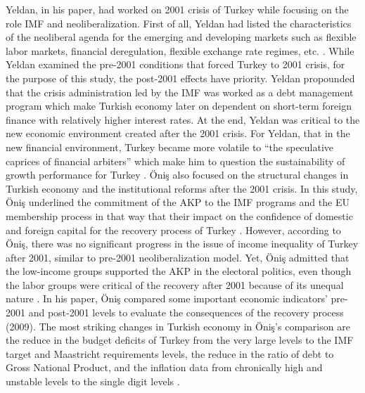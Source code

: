 \documentclass[11pt]{article}
\begin{document}
\noindent Yeldan, in his paper, had worked on 2001 crisis of Turkey while focusing on the role IMF and neoliberalization. First of all, Yeldan had listed the characteristics of the neoliberal agenda for the emerging and developing markets such as flexible labor markets, financial deregulation, flexible exchange rate regimes, etc. \cite{yeldan2006neoliberal}. While Yeldan examined the pre-2001 conditions that forced Turkey to 2001 crisis, for the purpose of this study, the post-2001 effects have priority. Yeldan propounded that the crisis administration led by the IMF was worked as a debt management program which make Turkish economy later on dependent on short-term foreign finance with relatively higher interest rates. At the end, Yeldan was critical to the new economic environment created after the 2001 crisis. For Yeldan, that in the new financial environment, Turkey became more volatile to “the speculative caprices of financial arbiters” which make him to question the sustainability of growth performance for Turkey \cite{yeldan2006neoliberal}. Öniş also focused on the structural changes in Turkish economy and the institutional reforms after the 2001 crisis. In this study, Öniş underlined the commitment of the AKP to the IMF programs and the EU membership process in that way that their impact on the confidence of domestic and foreign capital for the recovery process of Turkey \cite{onics2009beyond}. However, according to Öniş, there was no significant progress in the issue of income inequality of Turkey after 2001, similar to pre-2001 neoliberalization model. Yet, Öniş admitted that the low-income groups supported the AKP in the electoral politics, even though the labor groups were critical of the recovery after 2001 because of its unequal nature \cite{onics2009beyond}. In his paper, Öniş compared some important economic indicators’ pre-2001 and post-2001 levels to evaluate the consequences of the recovery process (2009). The most striking changes in Turkish economy in Öniş’s comparison are the reduce in the budget deficits of Turkey from the very large levels to the IMF target and Maastricht requirements levels, the reduce in the ratio of debt to Gross National Product, and the inflation data from chronically high and unstable levels to the single digit levels \cite{onics2009beyond}. \\

\pagebreak
\end{document}
